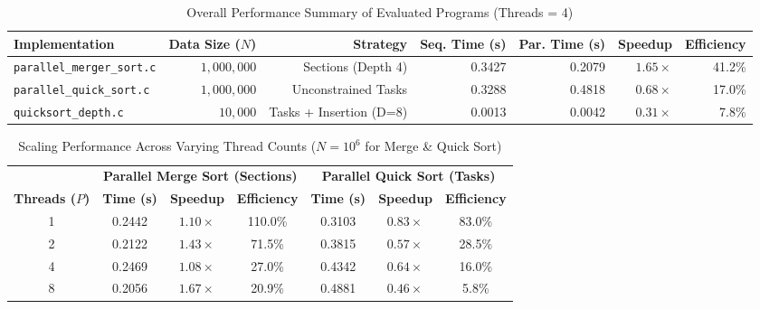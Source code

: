 \documentclass[12pt]{article}
\begin{document}
\begin{table}[H]
\centering
\caption{Overall Performance Summary of Evaluated Programs (Threads = 4)}
\vspace{4pt}
\begin{tabular}{@{}lrrrrrr@{}}
\toprule
\textbf{Implementation} & \textbf{Data Size ($N$)} & \textbf{Strategy} & \textbf{Seq. Time (s)} & \textbf{Par. Time (s)} & \textbf{Speedup} & \textbf{Efficiency} \\
\midrule
\texttt{parallel\_merger\_sort.c} & $1,000,000$ & Sections (Depth 4) & 0.3427 & 0.2079 & $1.65\times$ & 41.2\% \\
\texttt{parallel\_quick\_sort.c}  & $1,000,000$ & Unconstrained Tasks & 0.3288 & 0.4818 & $0.68\times$ & 17.0\% \\
\texttt{quicksort\_depth.c}       & $10,000$    & Tasks + Insertion (D=8) & 0.0013 & 0.0042 & $0.31\times$ & 7.8\% \\
\bottomrule
\end{tabular}
\label{tab:overall_summary}
\end{table}

\begin{table}[H]
\centering
\caption{Scaling Performance Across Varying Thread Counts ($N = 10^6$ for Merge \& Quick Sort)}
\vspace{4pt}
\begin{tabular}{@{}c ccc ccc@{}}
\toprule
& \multicolumn{3}{c}{\textbf{Parallel Merge Sort (Sections)}} & \multicolumn{3}{c}{\textbf{Parallel Quick Sort (Tasks)}} \\
\cmidrule(lr){2-4} \cmidrule(lr){5-7}
\textbf{Threads ($P$)} & \textbf{Time (s)} & \textbf{Speedup} & \textbf{Efficiency} & \textbf{Time (s)} & \textbf{Speedup} & \textbf{Efficiency} \\
\midrule
1 & 0.2442 & $1.10\times$ & 110.0\% & 0.3103 & $0.83\times$ & 83.0\% \\
2 & 0.2122 & $1.43\times$ & 71.5\%  & 0.3815 & $0.57\times$ & 28.5\% \\
4 & 0.2469 & $1.08\times$ & 27.0\%  & 0.4342 & $0.64\times$ & 16.0\% \\
8 & 0.2056 & $1.67\times$ & 20.9\%  & 0.4881 & $0.46\times$ & 5.8\% \\
\bottomrule
\end{tabular}
\label{tab:scaling_table}
\end{table}
\end{document}
